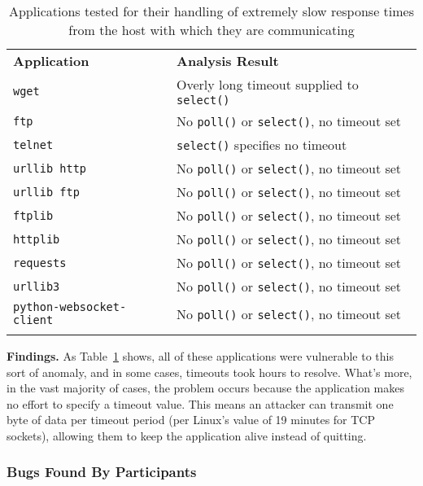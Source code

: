 \begin{table}[t]
  \scriptsize{}
  \begin{tabular}{l | l}
    \toprule{}
    {\bf Application}              & {\bf Analysis Result}\\
    {\tt wget}                     & Overly long timeout supplied to {\tt select()} \\
    {\tt ftp}                      & No {\tt poll()} or {\tt select()}, no timeout set \\
    {\tt telnet}                   & {\tt select()} specifies no timeout \\
    {\tt urllib http}              & No {\tt poll()} or {\tt select()}, no timeout set \\
    {\tt urllib ftp}               & No {\tt poll()} or {\tt select()}, no timeout set \\
    {\tt ftplib}                   & No {\tt poll()} or {\tt select()}, no timeout set \\
    {\tt httplib}                  & No {\tt poll()} or {\tt select()}, no timeout set \\
    {\tt requests}                 & No {\tt poll()} or {\tt select()}, no timeout set \\
    {\tt urllib3}                  & No {\tt poll()} or {\tt select()}, no timeout set \\
    {\tt python-websocket-client}  & No {\tt poll()} or {\tt select()}, no timeout set \\
    \bottomrule{}
  \end{tabular}
  \caption{Applications tested for their handling of extremely slow response
    times from the host with which they are communicating }
  \label{table:slowloris}
\end{table}


{\bf Findings.}
As Table~\ref{table:slowloris} shows, all of these
applications were vulnerable to this sort of anomaly,
and in some cases,
timeouts took hours to resolve.
What's more, in the vast majority of
cases, the problem occurs because the application makes no effort to
specify a timeout value.  This means an attacker can transmit one byte of
data per timeout period (per Linux's value of 19 minutes for TCP sockets),
allowing them to keep the application alive instead of quitting.

\subsubsection{Bugs Found By Participants}

